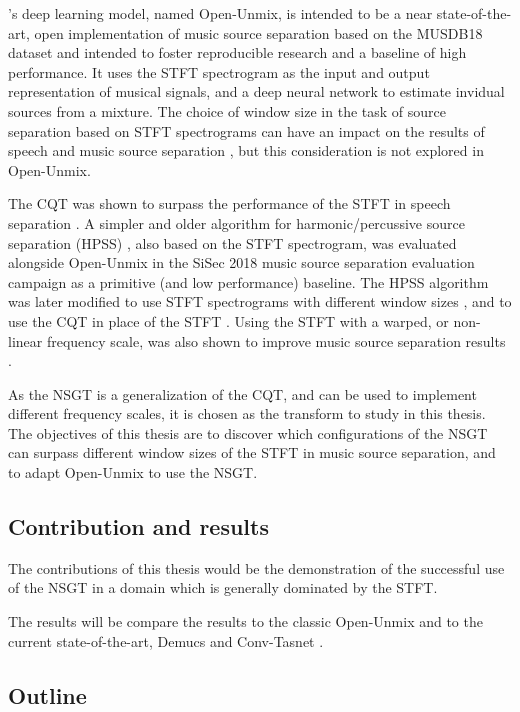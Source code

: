 \documentclass[letter,12pt,notitlepage]{article}
\begin{document}
\textcite{umx}'s deep learning model, named Open-Unmix, is intended to be a near state-of-the-art, open implementation of music source separation based on the MUSDB18 dataset \cite{musdb18} and intended to foster reproducible research and a baseline of high performance. It uses the STFT spectrogram as the input and output representation of musical signals, and a deep neural network to estimate invidual sources from a mixture. The choice of window size in the task of source separation based on STFT spectrograms can have an impact on the results of speech and music source separation \cite{musicsepwindow}, but this consideration is not explored in Open-Unmix.

The CQT was shown to surpass the performance of the STFT in speech separation \cite{cqtseparation}. A simpler and older algorithm for harmonic/percussive source separation (HPSS) \cite{fitzgerald1}, also based on the STFT spectrogram, was evaluated alongside Open-Unmix in the SiSec 2018 music source separation evaluation campaign \cite{sisec2018} as a primitive (and low performance) baseline. The HPSS algorithm was later modified to use STFT spectrograms with different window sizes \cite{driedger, fitzgerald2}, and to use the CQT in place of the STFT \cite{fitzgerald2}. Using the STFT with a warped, or non-linear frequency scale, was also shown to improve music source separation results \cite{bettermusicsep}.

As the NSGT is a generalization of the CQT, and can be used to implement different frequency scales, it is chosen as the transform to study in this thesis. The objectives of this thesis are to discover which configurations of the NSGT can surpass different window sizes of the STFT in music source separation, and to adapt Open-Unmix to use the NSGT.

\subsection{Contribution and results}

The contributions of this thesis would be the demonstration of the successful use of the NSGT in a domain which is generally dominated by the STFT. 

The results will be compare the results to the classic Open-Unmix and to the current state-of-the-art, Demucs and Conv-Tasnet \cite{demucs}.

\subsection{Outline}
\end{document}
